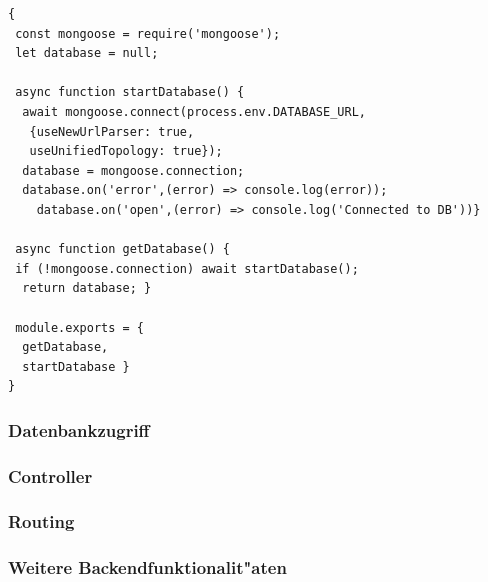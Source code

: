 \begin{lstlisting}[caption=Verbindung zur MongoDB-Datenbank, label=lst:mongodbconnection]
{
 const mongoose = require('mongoose');
 let database = null;

 async function startDatabase() {
  await mongoose.connect(process.env.DATABASE_URL, 
   {useNewUrlParser: true,
   useUnifiedTopology: true}); 
  database = mongoose.connection;
  database.on('error',(error) => console.log(error));
  	database.on('open',(error) => console.log('Connected to DB'))}

 async function getDatabase() {
 if (!mongoose.connection) await startDatabase();
  return database; }

 module.exports = {
  getDatabase,
  startDatabase }
}
\end{lstlisting}



\subsubsection{Datenbankzugriff}                   


\subsubsection{Controller} 



\subsubsection{Routing} 


\subsubsection{Weitere Backendfunktionalit"aten} 


